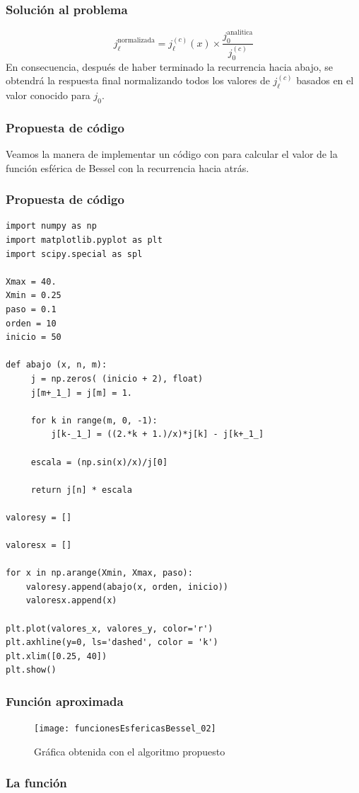 \begin{frame}
\frametitle{Solución al problema}
\begin{equation}
j_{\ell}^{\text{normalizada}} = j_{\ell}^{(c)} (x) \times \dfrac{j_{0}^{\text{analitica}}}{j_{0}^{(c)}}
\label{eq:ecuacion_02_26}
\end{equation}
En consecuencia, después de haber terminado la recurrencia hacia abajo, se obtendrá la respuesta final normalizando todos los valores de $j_{\ell}^{(c)}$ basados en el valor conocido para $j_{0}$.
\end{frame}
\begin{frame}[fragile]
\frametitle{Propuesta de código}
Veamos la manera de implementar un código con \python para calcular el valor de la función esférica de Bessel con la recurrencia hacia atrás.
\end{frame}
\begin{frame}
\frametitle{Propuesta de código}
\begin{lstlisting}[caption=Usando la regla de recurrencia hacia atrás, style= FormattedNumber, basicstyle=\linespread{0.9}\ttfamily\small, columns=fullflexible]
import numpy as np
import matplotlib.pyplot as plt
import scipy.special as spl

Xmax = 40.
Xmin = 0.25
paso = 0.1
orden = 10
inicio = 50

def abajo (x, n, m):
     j = np.zeros( (inicio + 2), float)
     j[m+_1_] = j[m] = 1.
     
     for k in range(m, 0, -1):
         j[k-_1_] = ((2.*k + 1.)/x)*j[k] - j[k+_1_]
     
     escala = (np.sin(x)/x)/j[0]
     
     return j[n] * escala

valoresy = []

valoresx = []

for x in np.arange(Xmin, Xmax, paso):
    valoresy.append(abajo(x, orden, inicio))
    valoresx.append(x)

plt.plot(valores_x, valores_y, color='r')
plt.axhline(y=0, ls='dashed', color = 'k')
plt.xlim([0.25, 40])
plt.show()
\end{lstlisting}
\end{frame}
\begin{frame}
\frametitle{Función aproximada}
\begin{figure}
\centering
\texttt{[image: funcionesEsfericasBessel\_02]}
\caption{Gráfica obtenida con el algoritmo propuesto}
\end{figure}
\end{frame}
\begin{frame}
\frametitle{La función }
    


\end{frame}
